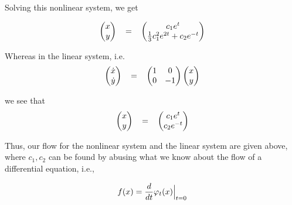 \begin{solution}

    Solving this nonlinear system, we get

    \begin{align}
        \begin{pmatrix}x\\y\end{pmatrix} 
        \hspace{3mm} = \hspace{3mm}
        \begin{pmatrix}
            c_1 e^t\\
            \frac{1}{3} c_1^2 e^{2 t} + c_2 e^{-t}
        \end{pmatrix}\nonumber
    \end{align}

    Whereas in the linear system, i.e.
    \begin{align}
        \begin{pmatrix}\dot{x}\\\dot{y}\end{pmatrix} 
        \hspace{3mm} = \hspace{3mm}
        \begin{pmatrix}1 &0\\0 &-1\end{pmatrix}
        \begin{pmatrix}x\\y\end{pmatrix} 
        \nonumber
    \end{align}

    we see that 
    \begin{align}
        \begin{pmatrix}x\\y\end{pmatrix} 
        \hspace{3mm} = \hspace{3mm}
        \begin{pmatrix}
            c_1 e^t\\
            c_2 e^{-t}
        \end{pmatrix}\nonumber
    \end{align}

    Thus, our flow for the nonlinear system and the linear system are given above, where $c_1, c_2$ can be found by abusing what we know about the flow of a differential equation, i.e., 

    \[
    f(x) = \frac{d}{dt}\varphi_t(x)\Big|_{t = 0}
    \]


\end{solution}
